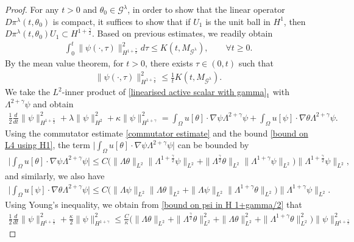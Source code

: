 \documentclass[reqno]{amsart}%
\theoremstyle{definition}
\theoremstyle{remark}
\numberwithin{equation}{section}
\newcommand{\1}{\mathbf{1}}
\newcommand{\Gg}{\mathcal{G}^{\lambda}}
\newcommand{\pin}{\pi^{\lambda}}
\newcommand{\intox}{\int_{\Omega}}
\numberwithin{equation}{section}
\numberwithin{theorem}{section}
\numberwithin{figure}{section}
\begin{document}
\begin{proof}
For any $t>0$ and $\theta_0\in\Gg$, in order to show that the linear operator $D\pin(t, \theta_0)$ is compact, it suffices to show that if $U_1$ is the unit ball in $H^1$, then $D\pin(t, \theta_0)U_1\subset H^{1+\frac{\gamma}{2}}$. Based on previous estimates, we readily obtain
\begin{align*}
\int_0^t\|\psi(\cdot,\tau)\|^2_{H^{1+\frac{\gamma}{2}}}d\tau\le K(t,M_{\Gg}),\qquad\forall t\ge0.
\end{align*}
By the mean value theorem, for $t>0$, there exists $\tau\in(0,t)$ such that
\begin{align}\label{bound on psi in H 1+gamma/2}
\|\psi(\cdot,\tau)\|^2_{H^{1+\frac{\gamma}{2}}}\le \frac{1}{t}K(t,M_{\Gg}).
\end{align}
We take the $L^2$-inner product of \eqref{linearised active scalar with gamma}$_1$ with $\Lambda^{2+\gamma}\psi$ and obtain
\begin{align*}
\frac{1}{2}\frac{d}{dt}\|\psi\|^2_{H^{1+\frac{\gamma}{2}}}+\lambda\|\psi\|^2_{H^2}+\kappa\|\psi\|^2_{H^{1+\gamma}}=\intox u[\theta]\cdot \nabla \psi\Lambda^{2+\gamma}\psi+\intox u[\psi]\cdot\nabla\theta\Lambda^{2+\gamma}\psi.
\end{align*}
Using the commutator estimate \eqref{commutator estimate} and the bound \eqref{bound on L4 using H1}, the term $\Big|\intox u[\theta]\cdot \nabla \psi\Lambda^{2+\gamma}\psi\Big|$ can be bounded by
\begin{align*}
\Big|\intox u[\theta]\cdot \nabla \psi\Lambda^{2+\gamma}\psi\Big|\le C\Big(\|\Lambda\theta\|_{L^2}\|\Lambda^{1+\frac{\gamma}{2}} \psi\|_{L^2}+\|\Lambda^\frac{\gamma}{2}\theta\|_{L^2}\|\Lambda^{1+\gamma} \psi\|_{L^2}\Big)\|\Lambda^{1+\frac{\gamma}{2}} \psi\|_{L^2},
\end{align*}
and similarly, we also have
\begin{align*}
\Big|\intox u[\psi]\cdot \nabla \theta\Lambda^{2+\gamma}\psi\Big|\le C\Big(\|\Lambda \psi\|_{L^2}\|\Lambda \theta\|_{L^2}+\|\Lambda \psi\|_{L^2}\|\Lambda^{1+\gamma} \theta\|_{L^2}\Big)\|\Lambda^{1+\gamma} \psi\|_{L^2}.
\end{align*}
Using Young's inequality, we obtain from \eqref{bound on psi in H 1+gamma/2} that
\begin{align}\label{differential eqn for psi higher order}
\frac{1}{2}\frac{d}{dt}\|\psi\|^2_{H^{1+\frac{\gamma}{2}}}+\frac{\kappa}{2}\|\psi\|^2_{H^{1+\gamma}}\le \frac{C}{\kappa}\Big(\|\Lambda\theta\|_{L^2}+\|\Lambda^\frac{\gamma}{2}\theta\|^2_{L^2}+\|\Lambda\theta\|^2_{L^2}+\|\Lambda^{1+\gamma}\theta\|^2_{L^2}\Big)\|\psi\|^2_{H^{1+\frac{\gamma}{2}}}

\end{align}
\end{proof}
\end{document}
